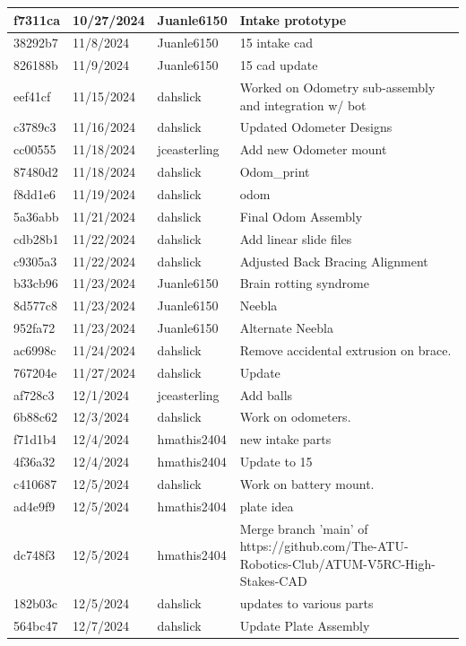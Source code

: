 \begin{center}
\begin{longtable}{|p{28pt}|p{33pt}|p{40pt}|p{300pt}|}
f7311ca & 10/27/2024 & Juanle6150 & Intake prototype \\
\hline
38292b7 & 11/8/2024 & Juanle6150 & 15 intake cad \\
\hline
826188b & 11/9/2024 & Juanle6150 & 15 cad update \\
\hline
eef41cf & 11/15/2024 & dahslick & Worked on Odometry sub-assembly and integration w/ bot \\
\hline
c3789c3 & 11/16/2024 & dahslick & Updated Odometer Designs \\
\hline
cc00555 & 11/18/2024 & jceasterling & Add new Odometer mount \\
\hline
87480d2 & 11/18/2024 & dahslick & Odom_print \\
\hline
f8dd1e6 & 11/19/2024 & dahslick & odom \\
\hline
5a36abb & 11/21/2024 & dahslick & Final Odom Assembly \\
\hline
cdb28b1 & 11/22/2024 & dahslick & Add linear slide files \\
\hline
c9305a3 & 11/22/2024 & dahslick & Adjusted Back Bracing Alignment \\
\hline
b33cb96 & 11/23/2024 & Juanle6150 & Brain rotting syndrome \\
\hline
8d577c8 & 11/23/2024 & Juanle6150 & Neebla \\
\hline
952fa72 & 11/23/2024 & Juanle6150 & Alternate Neebla \\
\hline
ac6998c & 11/24/2024 & dahslick & Remove accidental extrusion on brace. \\
\hline
767204e & 11/27/2024 & dahslick & Update \\
\hline
af728c3 & 12/1/2024 & jceasterling & Add balls \\
\hline
6b88c62 & 12/3/2024 & dahslick & Work on odometers. \\
\hline
f71d1b4 & 12/4/2024 & hmathis2404 & new intake parts \\
\hline
4f36a32 & 12/4/2024 & hmathis2404 & Update to 15 \\
\hline
c410687 & 12/5/2024 & dahslick & Work on battery mount. \\
\hline
ad4e9f9 & 12/5/2024 & hmathis2404 & plate idea \\
\hline
dc748f3 & 12/5/2024 & hmathis2404 & Merge branch 'main' of https://github.com/The-ATU-Robotics-Club/ATUM-V5RC-High-Stakes-CAD \\
\hline
182b03c & 12/5/2024 & dahslick & updates to various parts \\
\hline
564bc47 & 12/7/2024 & dahslick & Update Plate Assembly \\

\end{longtable}
\end{center}
